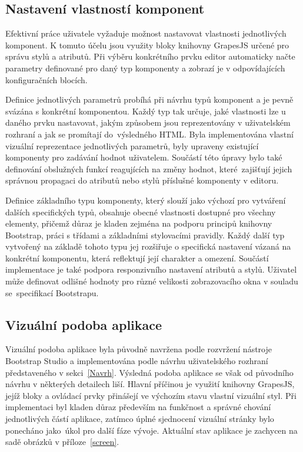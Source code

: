 \subsection{Nastavení vlastností komponent}
Efektivní práce uživatele vyžaduje možnost nastavovat vlastnosti jednotlivých komponent. K tomuto účelu jsou využity bloky knihovny GrapesJS určené pro správu stylů a atributů. Při výběru konkrétního prvku editor automaticky načte parametry definované pro daný typ komponenty a zobrazí je v odpovídajících konfiguračních blocích.

Definice jednotlivých parametrů probíhá při návrhu typů komponent a je pevně svázána s konkrétní komponentou. Každý typ tak určuje, jaké vlastnosti lze u daného prvku nastavovat, jakým způsobem jsou reprezentovány v uživatelském rozhraní a jak se promítají do~výsledného HTML. Byla implementována vlastní vizuální reprezentace jednotlivých parametrů, byly upraveny existující komponenty pro zadávání hodnot uživatelem. Součástí této úpravy bylo také definování obslužných funkcí reagujících na změny hodnot, které~zajišťují jejich správnou propagaci do atributů nebo stylů příslušné komponenty v editoru.

Definice základního typu komponenty, který slouží jako výchozí pro vytváření dalších specifických typů, obsahuje obecné vlastnosti dostupné pro všechny elementy, přičemž důraz je kladen zejména na podporu principů knihovny Bootstrap, práci s třídami a základními stylovacími pravidly. Každý další typ vytvořený na základě tohoto typu jej rozšiřuje o specifická nastavení vázaná na konkrétní komponentu, která reflektují její charakter a omezení. Součástí implementace je také podpora responzivního nastavení atributů a stylů. Uživatel může definovat odlišné hodnoty pro různé velikosti zobrazovacího okna v souladu se~specifikací Bootstrapu.

\subsection{Vizuální podoba aplikace}
Vizuální podoba aplikace byla původně navržena podle rozvržení nástroje Bootstrap Studio a implementována podle návrhu uživatelského rozhraní představeného v sekci~\ref{Navrh}. Výsledná podoba aplikace se však od původního návrhu v některých detailech liší. Hlavní příčinou je využití knihovny GrapesJS, jejíž bloky a ovládací prvky přinášejí ve výchozím stavu vlastní vizuální styl. Při implementaci byl kladen důraz především na funkčnost a správné chování jednotlivých částí aplikace, zatímco úplné sjednocení vizuální stránky bylo ponecháno jako~úkol pro další fáze vývoje. Aktuální stav aplikace je zachycen na sadě obrázků v příloze~\ref{screen}.


